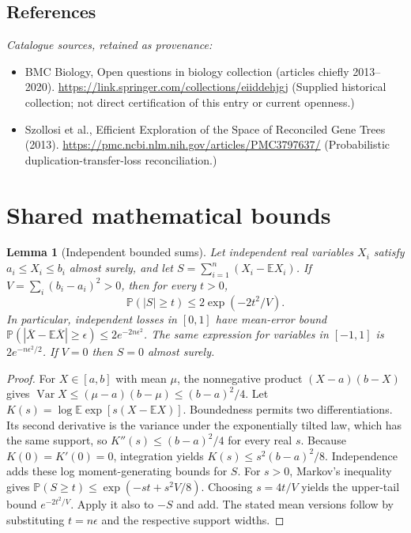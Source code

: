 \documentclass[11pt]{article}
\newcommand{\E}{\mathbb E}
\newcommand{\Prob}{\mathbb P}
\DeclareMathOperator{\Var}{Var}
\providecommand{\E}{\mathbb E}
\providecommand{\Prob}{\mathbb P}
\providecommand{\Var}{\operatorname{Var}}
\newtheorem{sharedlemma}{Lemma}[section]
\begin{document}
\subsection{References}
\noindent\emph{Catalogue sources, retained as provenance:}
\begin{itemize}
\item BMC Biology, Open questions in biology collection (articles chiefly 2013--2020). \url{https://link.springer.com/collections/eiiddehjgj} (Supplied historical collection; not direct certification of this entry or current openness.)
\item Szollosi et al., Efficient Exploration of the Space of Reconciled Gene Trees (2013). \url{https://pmc.ncbi.nlm.nih.gov/articles/PMC3797637/} (Probabilistic duplication-transfer-loss reconciliation.)
\end{itemize}
\clearpage


\appendix
\section{Shared mathematical bounds}\label{app:bounds}
\begin{sharedlemma}[Independent bounded sums]\label{lem:bounded}
Let independent real variables $X_i$ satisfy $a_i\leq X_i\leq b_i$ almost surely,
and let $S=\sum_{i=1}^n(X_i-\E X_i)$. If
$V=\sum_i(b_i-a_i)^2>0$, then for every $t>0$,
\[
 \Prob(|S|\geq t)\leq 2\exp(-2t^2/V).
\]
In particular, independent losses in $[0,1]$ have mean-error bound
$\Prob(|\overline X-\E\overline X|\geq\epsilon)
\leq2e^{-2n\epsilon^2}$. The same expression for variables in $[-1,1]$
is $2e^{-n\epsilon^2/2}$. If $V=0$ then $S=0$ almost surely.
\end{sharedlemma}
\begin{proof}
For $X\in[a,b]$ with mean $\mu$, the nonnegative product
$(X-a)(b-X)$ gives
$\Var X\leq(\mu-a)(b-\mu)\leq(b-a)^2/4$.
Let $K(s)=\log\E\exp[s(X-\E X)]$.
Boundedness permits two differentiations. Its second derivative is the variance
under the exponentially tilted law, which has the same support, so
$K''(s)\leq(b-a)^2/4$ for every real $s$.
Because $K(0)=K'(0)=0$, integration yields
$K(s)\leq s^2(b-a)^2/8$.
Independence adds these log moment-generating bounds for $S$.
For $s>0$, Markov's inequality gives
$\Prob(S\geq t)\leq\exp(-st+s^2V/8)$.
Choosing $s=4t/V$ yields the upper-tail bound $e^{-2t^2/V}$.
Apply it also to $-S$ and add. The stated mean versions follow by substituting
$t=n\epsilon$ and the respective support widths.
\end{proof}
\end{document}
